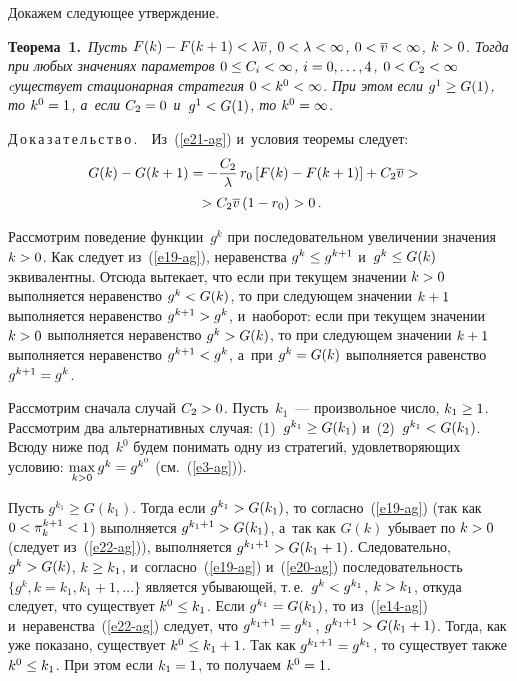 \begin{multicols}{2}
  Докажем следующее утверждение. 
  
  \smallskip
  
  \noindent
  \textbf{Теорема~1.}\ \textit{Пусть $F(k) \hm- F(k+1) \hm< \lambda 
\overline{v}$, $0\hm< \lambda \hm< \infty$, $0\hm< \overline{v}\hm< \infty$, 
$k\hm>0$. Тогда при любых значениях параметров $0\hm\leq C_i \hm<\infty$, 
$i\hm= 0,\ldots, 4$, $0\hm< C_2 \hm<\infty$ cуществует стационарная стратегия 
$0\hm< k^0 \hm< \infty$.   При этом если $g^1\hm\geq G(1)$, то $k^0\hm=1$, 
а~если $C_2\hm=0$ и~$g^1\hm < G(1)$, то} $k^0\hm=\infty$.
  
  \smallskip
  
  \noindent
  Д\,о\,к\,а\,з\,а\,т\,е\,л\,ь\,с\,т\,в\,о\,.\ \ Из~(\ref{e21-ag}) и~условия 
теоремы следует:
  \begin{multline}
  \hspace*{-6pt}G(k) -G(k+1) = -\displaystyle\frac{\displaystyle C_2\mathstrut}{\displaystyle \lambda\mathstrut}\,r_0 \left[ F(k) -
F(k+1)\right]+C_2\overline{v} >{}\\
{}> C_2\overline{v} \left( 1-r_0\right) >0\,.
  \label{e22-ag}
  \end{multline}
  
  Рассмотрим поведение функции~$g^k$ при последовательном увеличении 
значения $k\hm>0$. Как следует из~(\ref{e19-ag}), неравенства $g^k\hm\leq 
g^{k+1}$ и~$g^k\hm\leq G(k)$ эквивалентны. Отсюда вытекает, что если при 
текущем значении $k\hm>0$ выполняется неравенство $g^k\hm< G(k)$, то при 
следующем значении $k\hm+1$ выполняется неравенство $g^{k+1}\hm> g^k$,
 и~наоборот: если при текущем значении $k\hm>0$ выполняется неравенство 
$g^k\hm> G(k)$, то при следующем значении $k\hm+1$ выполняется 
неравенство $g^{k+1}\hm< g^k$, а~при $g^k\hm= G(k)$ выполняется равенство 
$g^{k+1}\hm= g^k$. 
  
  Рассмотрим сначала случай $C_2\hm>0$. Пусть~$k_1$~--- произвольное 
число, $k_1\hm\geq 1$. Рассмотрим два альтернативных случая: (1)~$g^{k_1} 
\hm\geq G(k_1)$ и~(2)~$g^{k_1}\hm< G(k_1)$. Всюду ниже под~$k^0$ будем 
понимать одну из стратегий, удовлетворяющих условию: $\max\limits_{k>0} 
g^k\hm= g^{k^0}$ (см.~(\ref{e3-ag})).
  
  Пусть $g^{k_1}\geq G(k_1)$. Тогда если $g^{k_1}\hm> G(k_1)$, то 
согласно~(\ref{e19-ag}) (так как $0\hm< \pi_k^{k+1}\hm<1$) выполняется 
$g^{k_1+1}\hm> G(k_1)$, а~так как $G(k)$ убывает по $k\hm>0$ (следует  
из~(\ref{e22-ag})), выполняется $g^{k_1+1}\hm> G(k_1+1)$. Следовательно, 
$g^k\hm> G(k)$, $k\hm\geq k_1$, и~согласно~(\ref{e19-ag}) и~(\ref{e20-ag}) 
последовательность $\{ g^k, k=k_1, k_1+1,\ldots\}$ является убывающей, т.\,е.\ 
$g^k\hm< g^{k_1}$, $k\hm> k_1$, откуда следует, что существует $k^0\hm\leq 
k_1$. Если $g^{k_1}\hm= G(k_1)$, то из~(\ref{e14-ag}) 
  и~неравенства~(\ref{e22-ag}) следует, что $g^{k_1+1} \hm= g^{k_1}$, 
$g^{k_1+1}\hm> G(k_1+1)$. Тогда, как уже показано, существует $k^0\hm\leq 
k_1+1$. Так как $g^{k_1+1} \hm= g^{k_1}$, то существует также $k^0\hm\leq 
k_1$. При этом если $k_1\hm=1$, то получаем $k^0\hm=1$. 
  

\end{multicols}

